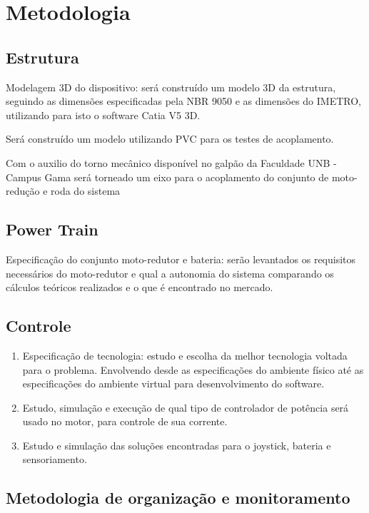 \chapter[Metodologia]{Metodologia}


\section{Estrutura}

Modelagem 3D do dispositivo: será construído um modelo 3D da estrutura, seguindo as dimensões especificadas pela NBR 9050 \cite{nbr9050} e as dimensões do IMETRO, utilizando para isto o software Catia V5 3D.

Será construído um modelo utilizando PVC para os testes de acoplamento.

Com o auxilio do torno mecânico disponível no galpão da Faculdade UNB - Campus Gama será torneado um eixo para o acoplamento do conjunto de moto-redução e roda do sistema

\section{Power Train}

Especificação do conjunto moto-redutor e bateria: serão levantados os requisitos necessários do moto-redutor e qual a autonomia do sistema comparando os cálculos teóricos realizados e o que é encontrado no mercado.

\section{Controle}

  \begin{enumerate}
    \item Especificação de tecnologia: estudo e escolha da melhor tecnologia voltada para o problema. Envolvendo desde as especificações do ambiente físico até as especificações do ambiente virtual para desenvolvimento do software.
    \item Estudo, simulação e execução de qual tipo de controlador de potência será usado no motor, para controle de sua corrente.
    \item Estudo e simulação das soluções encontradas para o joystick, bateria e sensoriamento.
  \end{enumerate}


\section{Metodologia de organização e monitoramento}

